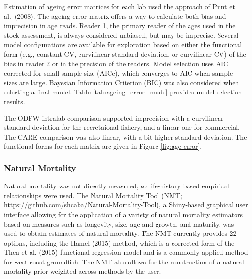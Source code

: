 \documentclass[11pt,
  english,
  a4paper,
]{article}
\begin{document}
\leavevmode\tagmcend\tagstructend\par


Estimation of ageing error matrices for each lab used the approach of Punt et al.~(2008). The ageing error matrix offers a way to calculate both bias and imprecision in age reads. Reader 1, the primary reader of the ages used in the stock assessment, is always considered unbiased, but may be imprecise. Several model configurations are available for exploration based on either the functional form (e.g., constant CV, curvilinear standard deviation, or curvilinear CV) of the bias in reader 2 or in the precision of the readers. Model selection uses AIC corrected for small sample size (AICc), which converges to AIC when sample sizes are large. Bayesian Information Criterion (BIC) was also considered when selecting a final model. Table \ref{tab:ageing_error_mods} provides model selection results.

\leavevmode\tagmcend\tagstructend\par


The ODFW intralab comparison supported imprecision with a curvilinear standard deviation for the recretaional fishery, and a linear one for commercial. The CARE comparison was also linear, with a bit higher standard deviation. The functional forms for each matrix are given in Figure \ref{fig:age-error}.

\leavevmode\tagmcend\tagstructend\par


\hypertarget{natural-mortality}{%
\subsubsection{Natural Mortality}\label{natural-mortality}}

\leavevmode\tagmcend\tagstructend


Natural mortality was not directly measured, so life-history based empirical relationships were used. The Natural Mortality Tool (NMT; {\url{https://github.com/shcaba/Natural-Mortality-Tool}\leavevmode\tagmcend\tagstructend}), a Shiny-based graphical user interface allowing for the application of a variety of natural mortality estimators based on measures such as longevity, size, age and growth, and maturity, was used to obtain estimates of natural mortality. The NMT currently provides 22 options, including the Hamel {(2015)\leavevmode\tagmcend\tagstructend} method, which is a corrected form of the Then et al. {(2015)\leavevmode\tagmcend\tagstructend} functional regression model and is a commonly applied method for west coast groundfish. The NMT also allows for the construction of a natural mortality prior weighted across methods by the user.
\end{document}
